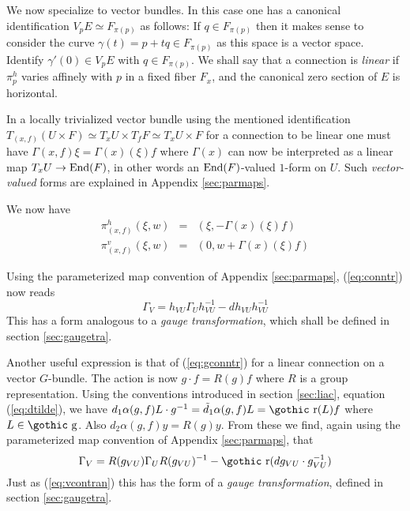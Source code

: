 \documentclass[12pt,titlepage]{article}
\def\goth#1{\hbox{\gothic #1}}
\def\gg{{\goth g}}
\def\gr{{\goth r}}
\def\End{\hbox{End}}
\begin{document}
We now specialize to vector bundles. In this case one has a
canonical identification  \(V_pE \simeq F_{\pi(p)}\) as follows:
If \(q\in F_{\pi(p)}\) then it makes sense to consider the curve
\(\gamma(t) = p+tq \in F_{\pi(p)}\) as this  space is a vector space.
Identify \(\gamma'(0)\in V_pE\) with \(q\in F_{\pi(p)}\).
We shall say that a connection is {\em
linear\/}
%
 if \(\pi^h_p\) varies affinely with \(p\) in a fixed fiber
\(F_x\), and the canonical zero section of \(E\) is
horizontal. 

In a locally trivialized vector bundle using the mentioned identification
\(T_{(x,f)}(U \times F) \simeq T_xU \times T_fF\simeq T_xU \times F\)  for
a connection to be linear one must have \(\Gamma(x,f)\xi =
\Gamma(x)(\xi)f\) where \(\Gamma(x)\)
% 
can now be interpreted as a
linear map \(T_xU \to \End(F)\), in other words an \(\End(F)\)-valued
\(1\)-form on \(U\). Such {\em vector-valued\/} forms are
explained in Appendix \ref{sec:parmaps}. 
\index{\(1\)-form!\(\End(F)\)-valued}%

We now have
\begin{eqnarray}
\pi^h_{(x,f)}(\xi,w) &=& (\xi, -\Gamma(x)(\xi)f) \\
\pi^v_{(x,f)}(\xi,w)  &=& (0,w+\Gamma(x)(\xi)f)
\end{eqnarray}%

Using the parameterized 
map convention of Appendix \ref{sec:parmaps},  (\ref{eq:conntr}) now reads
\begin{equation}\label{eq:vcontran}
\Gamma_V =
h_{VU}\Gamma_Uh_{VU}^{-1} 
-dh_{VU}h_{VU}^{-1}
\end{equation}
This
has a form analogous to a   {\em gauge
transformation\/}, which  shall be defined
in section \ref{sec:gaugetra}. 

Another useful expression is that of (\ref{eq:gconntr}) for 
a linear connection on a vector \(G\)-bundle.
The
action is now \(g\cdot f = R(g)f\) where \(R\) is a group representation.
Using the conventions introduced in section \ref{sec:liac}, 
equation (\ref{eq:dtilde}), we have
 \(d_1\alpha (g,f)L\cdot g^{-1} = \tilde d_1\alpha (g,f)L =
\gr(L)f\) where \(L\in \gg\). Also \(d_2\alpha(g,f)y = R(g)y\). From
these we find, again using the parameterized map convention of Appendix 
\ref{sec:parmaps}, that
\begin{equation}\label{eq:gammatrans}
\Gamma_V = R(g_{VU})\Gamma_UR(g_{VU})^{-1} - \gr
(dg_{VU}\cdot g_{VU}^{-1})
\end{equation}%
 Just as (\ref{eq:vcontran}) this
has the form of a {\em gauge
transformation\/}, defined in section \ref{sec:gaugetra}. 
%
\end{document}
